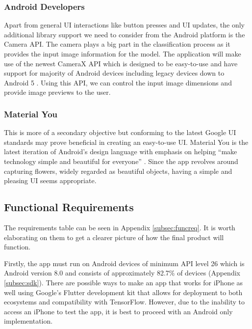 \documentclass[12pt,a4paper]{report}
\begin{document}
\subsubsection{Android Developers}

Apart from general UI interactions like button presses and UI updates, the only additional library support we need to 
consider from the Android platform is the Camera API. The camera plays a big part in the classification process as it 
provides the input image information for the model. The application will make use of the newest CameraX API which is 
designed to be easy-to-use and have support for majority of Android devices including legacy devices down to Android 5 
\citep{ADCameraX}. Using this API, we can control the input image dimensions and provide image previews to the 
user.

\subsubsection{Material You}

This is more of a secondary objective but conforming to the latest Google UI standards may prove beneficial in creating 
an easy-to-use UI. Material You is the latest iteration of Android's design language with emphasis on helping “make 
technology simple and beautiful for everyone” \citep{material}. Since the app revolves around capturing flowers, widely 
regarded as beautiful objects, having a simple and pleasing UI seems appropriate. 

\subsection{Functional Requirements}

The requirements table can be seen in Appendix \ref{subsec:funcreq}. It is worth elaborating on them to get a clearer 
picture of how the final product will function. 

\par

Firstly, the app must run on Android devices of minimum API level 26 which is Android version 8.0 and 
consists of approximately 82.7\% of devices (Appendix \ref{subsec:sdk}). 
There are possible ways to make an app that works for iPhone as well using Google's Flutter development kit that allows 
for deployment to both ecosystems and compatibility with TensorFlow. However, due to the inability to access an iPhone 
to test the app, it is best to proceed with an Android only implementation.
\end{document}
